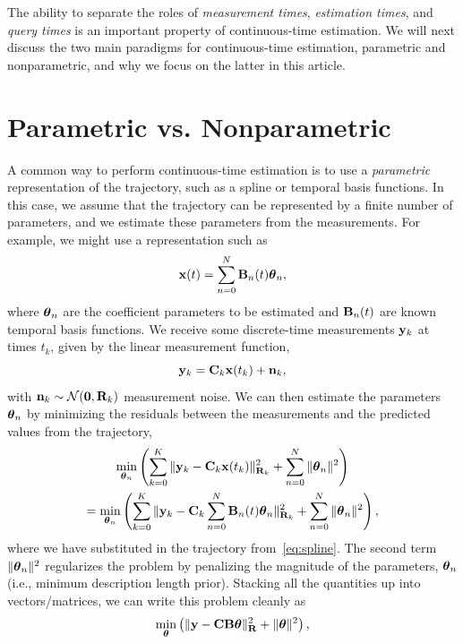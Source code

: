 The ability to separate the roles of {\em measurement times}, {\em estimation times}, and {\em query times} is an important property of continuous-time estimation.  We will next discuss the two main paradigms for continuous-time estimation, parametric and nonparametric, and why we focus on the latter in this article.

\section{Parametric vs. Nonparametric}

A common way to perform continuous-time estimation is to use a {\em parametric} representation of the trajectory, such as a spline or temporal basis functions.  In this case, we assume that the trajectory can be represented by a finite number of parameters, and we estimate these parameters from the measurements.  For example, we might use a representation such as 
\begin{equation}\label{eq:spline}
\mathbf{x}(t) = \sum_{n=0}^N \mathbf{B}_n(t) {\boldsymbol{\theta}}_n, 
\end{equation}
where ${\boldsymbol{\theta}}_n$ are the coefficient parameters to be estimated and $\mathbf{B}_n(t)$ are known temporal basis functions.  We receive some discrete-time measurements $\mathbf{y}_k$ at times $t_k$, given by the linear measurement function,
\begin{equation}
\mathbf{y}_k = \mathbf{C}_k \mathbf{x}(t_k) + \mathbf{n}_k,
\end{equation}
with $\mathbf{n}_k \sim \mathcal{N}(\mathbf{0}, \mathbf{R}_k)$ measurement noise.  We can then estimate the parameters ${\boldsymbol{\theta}}_n$ by minimizing the residuals between the measurements and the predicted values from the trajectory,
\begin{multline}
\min_{{\boldsymbol{\theta}}_n} \left( \sum_{k=0}^K \|\mathbf{y}_k - \mathbf{C}_k\mathbf{x}(t_k)\|^2_{\mathbf{R}_k} + \sum_{n=0}^N \|{\boldsymbol{\theta}}_n\|^2 \right) \\ = \min_{{\boldsymbol{\theta}}_n} \left( \sum_{k=0}^K \|\mathbf{y}_k - \mathbf{C}_k \sum_{n=0}^N \mathbf{B}_n(t) {\boldsymbol{\theta}}_n \|^2_{\mathbf{R}_k} + \sum_{n=0}^N \|{\boldsymbol{\theta}}_n\|^2 \right),
\end{multline}
where we have substituted in the trajectory from~\eqref{eq:spline}.  
The second term $\|{\boldsymbol{\theta}}_n\|^2$ regularizes the problem by penalizing the magnitude of the parameters, ${\boldsymbol{\theta}}_n$ (i.e., minimum description length prior).
Stacking all the quantities up into vectors/matrices, we can write this problem cleanly as
\begin{equation}\label{eq:least-sqr-intro}
\min_{{\boldsymbol{\theta}}} \left( \|\mathbf{y} - \mathbf{C}\mathbf{B}{\boldsymbol{\theta}}\|^2_{\mathbf{R}} + \|{\boldsymbol{\theta}}\|^2 \right),
\end{equation}
